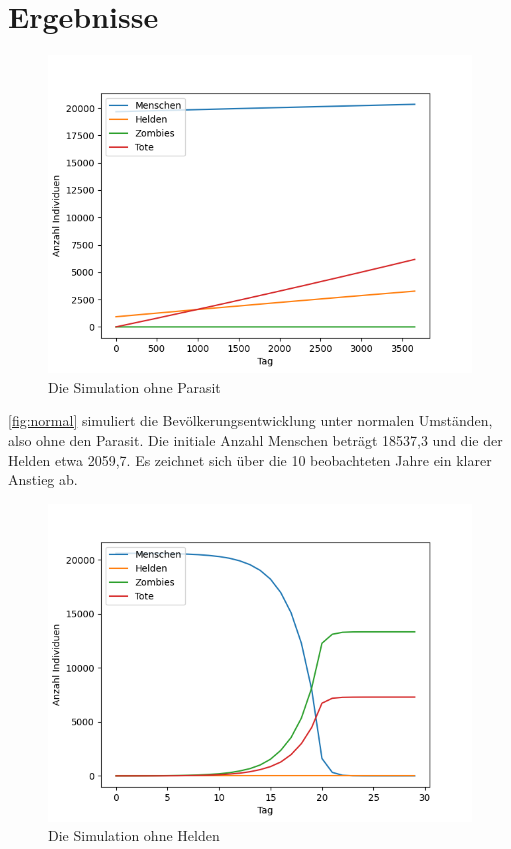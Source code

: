 \section{Ergebnisse} %
    \label{sec:ergebnisse}
    \begin{figure}[h]
        \centering
        \includegraphics[width=1\textwidth]{normal.png}
        \caption{Die Simulation ohne Parasit}
        \label{fig:normal}
    \end{figure}
    \autoref{fig:normal} simuliert die Bevölkerungsentwicklung unter normalen Umständen, also ohne den Parasit. Die initiale Anzahl Menschen beträgt 18537,3 und die der Helden etwa 2059,7. Es zeichnet sich über die 10 beobachteten Jahre ein klarer Anstieg ab.
    \newpage
    \begin{figure}[h]
        \centering
        \includegraphics[width=1\textwidth]{zombified_no_heroes.png}
        \caption{Die Simulation ohne Helden}
        \label{fig:no_heroes}
    \end{figure}

